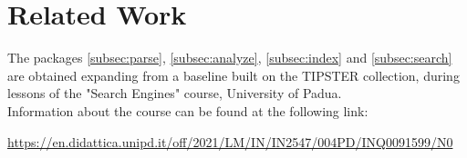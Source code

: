 \section{Related Work}
\label{sec:related work}

The packages \ref{subsec:parse}, \ref{subsec:analyze}, \ref{subsec:index} and \ref{subsec:search} are obtained expanding from a baseline built on the TIPSTER collection, during lessons of the "Search Engines" course, University of Padua.\\ Information about the course can be found at the following link:

\url{https://en.didattica.unipd.it/off/2021/LM/IN/IN2547/004PD/INQ0091599/N0}